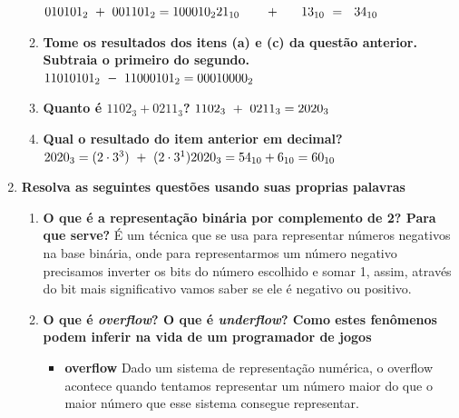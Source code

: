 \documentclass{abntex2}
\begin{document}
\begin{enumerate}
\begin{enumerate}
      \begin{math}
        \\ 010101_{2} \ + \ 001101_{2} = 100010_{2}
        \\ 21_{10} \ \ \ \ \ \  + \ \ \ \ \ 13_{10} \  = \ \ 34_{10}
      \end{math}
      \item \textbf{Tome os resultados dos itens (a) e (c) da questão anterior. Subtraia o primeiro do segundo.}
      \begin{math}
        \\ 11010101_{2} \ - \
           11000101_{2} = 00010000_{2}
      \end{math}
      \item \textbf{Quanto é $ 1102_{3} + 0211_{3}$?}
      \begin{math}
        \\ 1102_{3} \ + \
           0211_{3} = 2020_{3}
      \end{math}
      \item \textbf{Qual o resultado do item anterior em decimal?}
      \begin{math}
        \\ 2020_{3} = (2 \cdot 3^{3}) \ + \ (2 \cdot 3^{1})
        \\ 2020_{3} = 54_{10} + 6_{10} = 60_{10}
      \end{math}
    \end{enumerate}
    \item \textbf{Resolva as seguintes questões usando suas proprias palavras}
    \begin{enumerate}
      \item \textbf{O que é a representação binária por complemento de 2? Para que serve?}
      \linebreak É um técnica que se usa para representar números negativos na base binária, onde para representarmos um número negativo precisamos inverter os bits do número escolhido e somar 1, assim, através do bit mais significativo vamos saber se ele é negativo ou positivo.
      \item \textbf{O que é \textit{overflow}? O que é \textit{underflow}? Como estes fenômenos podem inferir na vida de um programador de jogos }
      \begin{itemize}
        \item \textbf{overflow} \linebreak
        Dado um sistema de representação numérica, o overflow acontece quando tentamos representar um número maior do que o maior número que esse sistema consegue representar.

\end{itemize}
\end{enumerate}
\end{enumerate}
\end{document}
